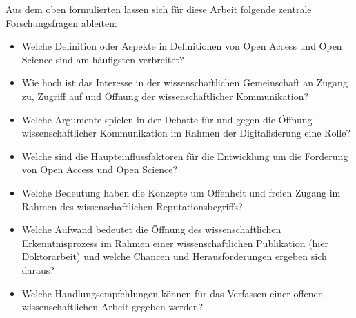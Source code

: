 Aus dem oben formulierten lassen sich für diese Arbeit folgende zentrale Forschungsfragen ableiten:
\begin{itemize}
\item Welche Definition oder Aspekte in Definitionen von Open Access und Open Science sind am häufigsten verbreitet?
\item Wie hoch ist das Interesse in der wissenschaftlichen Gemeinschaft an Zugang zu, Zugriff auf und Öffnung der wissenschaftlicher Kommunikation?
\item Welche Argumente spielen in der Debatte für und gegen die Öffnung wissenschaftlicher Kommunikation im Rahmen der Digitalisierung eine Rolle?
\item Welche sind die Haupteinflussfaktoren für die Entwicklung um die Forderung von Open Access und Open Science?
\item Welche Bedeutung haben die Konzepte um Offenheit und freien Zugang im Rahmen des wissenschaftlichen Reputationsbegriffs?
\item Welche Aufwand bedeutet die Öffnung des wissenschaftlichen Erkenntnisprozess im Rahmen einer wissenschaftlichen Publikation (hier Doktorarbeit) und welche Chancen und Herausforderungen ergeben sich daraus?
\item Welche Handlungsempfehlungen können für das Verfassen einer offenen wissenschaftlichen Arbeit gegeben werden?
\end{itemize}

